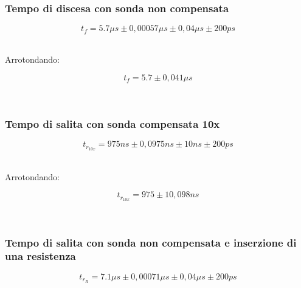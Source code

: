 \documentclass[a4paper]{article}
\begin{document}
\subsubsection{Tempo di discesa con sonda non compensata}
\begin{Large}
	\begin{equation}
  		{t_f}= 5.7\mu s \pm 0,00057\mu s \pm0,04\mu s \pm200ps
	\end{equation}
\end{Large}\\

Arrotondando: 

\begin{Large}
	\begin{equation}
  		{t_f}= 5.7\pm 0,041 \mu s
	\end{equation}
\end{Large}\\

\subsubsection{Tempo di salita con sonda compensata 10x}

\begin{Large}
	\begin{equation}
		{t_{r_{10x}}}= 975ns \pm 0,0975ns \pm10ns \pm200ps
	\end{equation}
\end{Large}\\

Arrotondando: 

\begin{Large}
	\begin{equation}
		{t_{r_{10x}}}= 975\pm 10,098 ns
	\end{equation}
\end{Large}\\

\subsubsection{Tempo di salita con sonda non compensata e inserzione di una resistenza}

\begin{Large}
	\begin{equation}
		t_{r_R}= 7.1\mu s \pm 0,00071\mu s \pm0,04\mu s \pm200ps
	\end{equation}
\end{Large}\\
\end{document}
